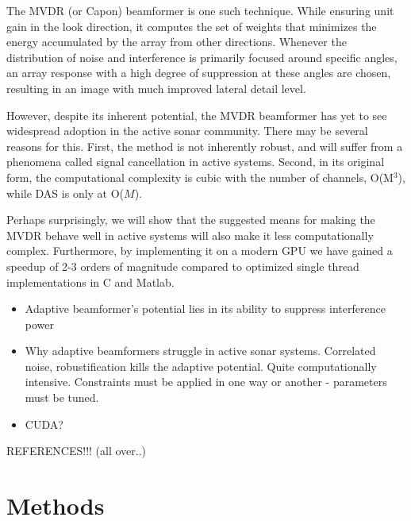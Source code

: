\documentclass[10pt,a4paper]{article}
\newcommand\1{\vec 1}
\begin{document}
The \gls{MVDR} (or Capon) beamformer is one such technique. While ensuring unit gain in the look direction, it computes the set of weights that minimizes the energy accumulated by the array from other directions. Whenever the distribution of noise and interference is primarily focused around specific angles, an array response with a high degree of suppression at these angles are chosen, resulting in an image with much improved lateral detail level.

However, despite its inherent potential, the \gls{MVDR} beamformer has yet to see widespread adoption in the active sonar community. There may be several reasons for this. First, the method is not inherently robust, and will suffer from a phenomena called signal cancellation in active systems. Second, in its original form, the computational complexity is cubic with the number of channels, O(M$^3$), while \gls{DAS} is only at O($M$).

Perhaps surprisingly, we will show that the suggested means for making the \gls{MVDR} behave well in active systems will also make it less computationally complex. Furthermore, by implementing it on a modern \gls{GPU} we have gained a speedup of 2-3 orders of magnitude compared to optimized single thread implementations in C and Matlab.


\begin{itemize}
\item Adaptive beamformer's potential lies in its ability to suppress interference power
\item Why adaptive beamformers struggle in active sonar systems. Correlated noise, robustification kills the adaptive potential. Quite computationally intensive. Constraints must be applied in one way or another - parameters must be tuned.
\item CUDA?
\end{itemize}

REFERENCES!!! (all over..)
% 


\newpage
\section{Methods}
\end{document}
